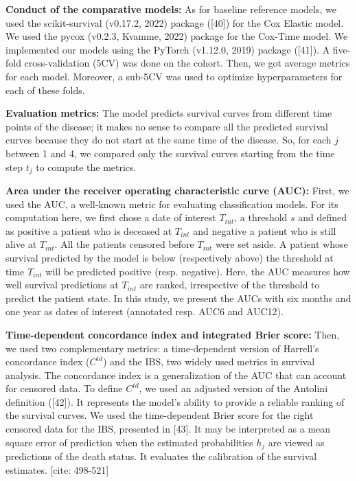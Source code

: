 \documentclass[a4paper,10pt]{article}
\begin{document}
\textbf{Conduct of the comparative models:} As for baseline reference models, we used the scikit-survival (v0.17.2, 2022) package ([40]) for the Cox Elastic model. We used the pycox (v0.2.3, Kvamme, 2022) package for the Cox-Time model. We implemented our models using the PyTorch (v1.12.0, 2019) package ([41]). A five-fold cross-validation (5CV) was done on the cohort. Then, we got average metrics for each model. Moreover, a sub-5CV was used to optimize hyperparameters for each of these folds.

\textbf{Evaluation metrics:} The model predicts survival curves from different time points of the disease; it makes no sense to compare all the predicted survival curves because they do not start at the same time of the disease. So, for each $j$ between 1 and 4, we compared only the survival curves starting from the time step $t_j$ to compute the metrics.

\textbf{Area under the receiver operating characteristic curve (AUC):} First, we used the AUC, a well-known metric for evaluating classification models. For its computation here, we first chose a date of interest $T_{int}$, a threshold $s$ and defined as positive a patient who is deceased at $T_{int}$ and negative a patient who is still alive at $T_{int}$. All the patients censored before $T_{int}$ were set aside. A patient whose survival predicted by the model is below (respectively above) the threshold at time $T_{int}$ will be predicted positive (resp. negative). Here, the AUC measures how well survival predictions at $T_{int}$ are ranked, irrespective of the threshold to predict the patient state. In this study, we present the AUCs with six months and one year as dates of interest (annotated resp. AUC6 and AUC12).

\textbf{Time-dependent concordance index and integrated Brier score:} Then, we used two complementary metrics: a time-dependent version of Harrell's concordance index ($C^{td}$) and the IBS, two widely used metrics in survival analysis. The concordance index is a generalization of the AUC that can account for censored data. To define $C^{td}$, we used an adjusted version of the Antolini definition ([42]). It represents the model's ability to provide a reliable ranking of the survival curves. We used the time-dependent Brier score for the right censored data for the IBS, presented in [43]. It may be interpreted as a mean square error of prediction when the estimated probabilities $h_j$ are viewed as predictions of the death status. It evaluates the calibration of the survival estimates. [cite: 498-521]
\end{document}
